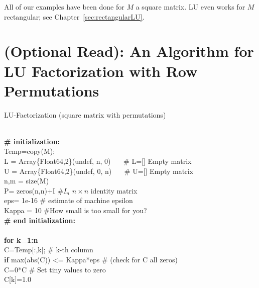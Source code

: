  \begin{tcolorbox}[sharp corners, colback=green!30, colframe=green!80!blue, title=\textbf{\Large How General Can LU Go?}]
  All of our examples have been done for $M$ a square matrix. LU even works for $M$ rectangular; see Chapter~\ref{sec:rectangularLU}.
 \end{tcolorbox}
 \newpage
 
 \section{(Optional Read): An Algorithm for LU Factorization with Row Permutations}
 
 \begin{tcolorbox}[sharp corners, colback=green!30, colframe=green!80!blue, title=\textbf{\Large LU Factorization of Square Matrices}]
 \begin{algorithm}[H]
\SetAlgoLined
{}
 \caption{LU-Factorization (square matrix with permutations)}
\end{algorithm}
\mbox{ } \\
 \textbf{\# initialization:}\\
 {\rm Temp}=copy(M); \\
L = Array\{Float64,2\}(undef, n, 0)  ~~~\# L=[] Empty matrix\\
U = Array\{Float64,2\}(undef, 0, n)  ~~~\# U=[] Empty matrix\\
n,m = size(M) \\
 P= zeros(n,n)+I  \#$I_n$  $n \times n$ identity matrix\\
 eps= 1e-16 \# estimate of machine epsilon \\
 Kappa = 10  \#How small is too small for you?\\
  \textbf{\# end initialization:}\\
\mbox{}  \\
\textbf{for {k=1:n}} \\
\hspace*{.3cm}    C=Temp[:,k]; \# k-th column\\
\hspace*{.3cm} \textbf{if}{ max(abs(C)) <= Kappa*eps \# (check for C all zeros) } \\
\hspace*{.6cm}  C=0*C \# Set tiny values to zero\\
\hspace*{.6cm}       C[k]=1.0 \\

\end{tcolorbox}
